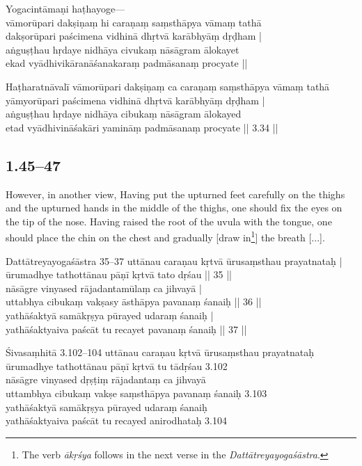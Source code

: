 \begin{ekdosis}
\begin{testimonia}[hp01_044]
Yogacintāmaṇi
\startverse
haṭhayoge—\\
vāmorūpari dakṣiṇaṃ hi caraṇaṃ saṃsthāpya vāmaṃ tathā\\
dakṣorūpari paścimena vidhinā dhṛtvā karābhyāṃ dṛḍham | \\
aṅguṣṭhau hṛdaye nidhāya civukaṃ nāsāgram ālokayet\\
ekad vyādhivikāranāśanakaraṃ padmāsanaṃ procyate ||
\endverse

Haṭharatnāvalī
\startverse
vāmorūpari dakṣiṇaṃ ca caraṇaṃ saṃsthāpya vāmaṃ tathā\\
yāmyorūpari paścimena vidhinā dhṛtvā karābhyāṃ dṛḍham |\\
aṅguṣṭhau hṛdaye nidhāya cibukaṃ nāsāgram ālokayed\\
etad vyādhivināśakāri yamināṃ padmāsanaṃ procyate || 3.34 ||
\endverse
\end{testimonia}

\subsection*{1.45--47}
\begin{translation}[hp01_045]
However, in another view,
Having put the upturned feet carefully on the thighs and the upturned hands in the middle of the thighs, one should fix the eyes on the tip of the nose. Having raised the root of the uvula with the tongue, one should place the chin on the chest and gradually [draw in\footnote{The verb \emph{ākṛśya} follows in the next verse in the \emph{Dattātreyayogaśāstra}.}] the breath [...].
\end{translation}

\begin{sources}[hp01_045]
Dattātreyayogaśāstra 35–37
\startverse
uttānau caraṇau kṛtvā ūrusaṃsthau prayatnataḥ |\\
ūrumadhye tathottānau pāṇī kṛtvā tato dṛśau || 35 ||\\
nāsāgre vinyased rājadantamūlaṃ ca jihvayā |\\
uttabhya cibukaṃ vakṣasy āsthāpya pavanaṃ śanaiḥ || 36 ||\\
yathāśaktyā samākṛṣya pūrayed udaraṃ śanaiḥ |\\
yathāśaktyaiva paścāt tu recayet pavanaṃ śanaiḥ || 37 ||
\endverse

Śivasaṃhitā 3.102–104
\startverse
uttānau caraṇau kṛtvā ūrusaṃsthau prayatnataḥ\\
ūrumadhye tathottānau pāṇī kṛtvā tu tādṛśau 3.102\\
nāsāgre vinyased dṛṣṭiṃ rājadantaṃ ca jihvayā\\
uttambhya cibukaṃ vakṣe saṃsthāpya pavanaṃ śanaiḥ 3.103\\
yathāśaktyā samākṛṣya pūrayed udaraṃ śanaiḥ\\
yathāśaktyaiva paścāt tu recayed anirodhataḥ 3.104
\endverse
\end{sources}


\end{ekdosis}
